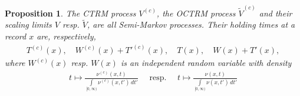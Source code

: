 \documentclass[12pt, a4paper]{article}
\newtheorem{proposition}[equation]{Proposition}
\newcommand{\1}{\mathbf 1}
\begin{document}
\begin{proposition}
  The CTRM process $V^{(c)}$, the OCTRM process $\tilde V^{(c)}$ and their 
  scaling limits $V$ resp. $\tilde V$, are all Semi-Markov processes. 
  Their holding times at a record $x$ are, respectively, 
  \begin{align}
    T^{(c)}(x), \quad W^{(c)}(x) + T'^{(c)}(x), \quad T(x), \quad W(x) + T'(x),
  \end{align}
  where $W^{(c)}(x)$ resp. $W(x)$ is an independent random variable with density 
  \begin{align} \label{eq:conditional-W}
    t \mapsto \frac{\nu^{(c)}(x,t)}{\int \limits_{[0,\infty)} \nu^{(c)}(x,t')\,dt'}
    \quad \text{ resp. } \quad 
    t \mapsto \frac{\nu(x,t)}{\int \limits_{[0,\infty)} \nu(x,t')\,dt'}
  \end{align}
\end{proposition}
\end{document}
